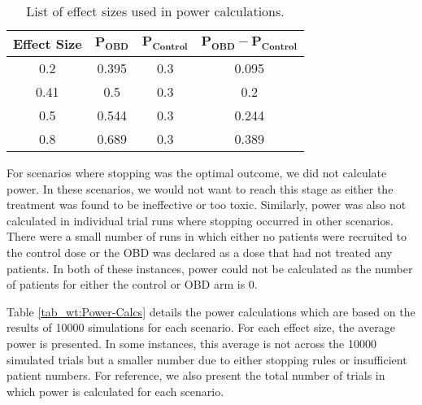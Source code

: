 \begin{table}[h!]
	\centering
	\caption{List of effect sizes used in power calculations.}
	\label{tab_wt:EffectSizes}
	\begin{tabular}{c|ccc}
		\hline
		\textbf{Effect Size} & $\mathbf{P_{OBD}}$ & $\mathbf{P_{Control}}$ & $\mathbf{P_{OBD} - P_{Control}}$ \\ \hline
		0.2                  & 0.395           & 0.3                 & 0.095          \\
		0.41                 & 0.5             & 0.3                 & 0.2            \\
		0.5                  & 0.544           & 0.3                 & 0.244          \\
		0.8                  & 0.689           & 0.3                 & 0.389          \\ \hline
	\end{tabular}
\end{table}

For scenarios where stopping was the optimal outcome, we did not calculate power. In these scenarios, we would not want to reach this stage as either the treatment was found to be ineffective or too toxic. Similarly, power was also not calculated in individual trial runs where stopping occurred in other scenarios. There were a small number of runs in which either no patients were recruited to the control dose or the OBD was declared as a dose that had not treated any patients. In both of these instances, power could not be calculated as the number of patients for either the control or OBD arm is 0. 
 
Table \ref{tab_wt:Power-Calcs} details the power calculations which are based on the results of 10000 simulations for each scenario. For each effect size, the average power is presented. In some instances, this average is not across the 10000 simulated trials but a smaller number due to either stopping rules or insufficient patient numbers. For reference, we also present the total number of trials in which power is calculated for each scenario. 

